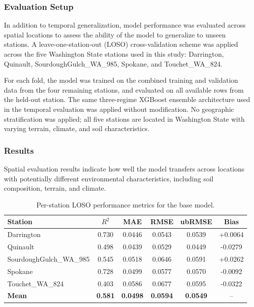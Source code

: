 \subsubsection*{Evaluation Setup}
In addition to temporal generalization, model performance was evaluated across spatial locations
to assess the ability of the model to generalize to unseen stations. A leave-one-station-out
(LOSO) cross-validation scheme was applied across the five Washington State stations used in
this study: Darrington, Quinault, SourdoughGulch\_WA\_985, Spokane, and Touchet\_WA\_824.

For each fold, the model was trained on the combined training and validation data from the
four remaining stations, and evaluated on all available rows from the held-out station. The
same three-regime XGBoost ensemble architecture used in the temporal evaluation was applied
without modification. No geographic stratification was applied; all five stations are located
in Washington State with varying terrain, climate, and soil characteristics.

\subsubsection*{Results}
Spatial evaluation results indicate how well the model transfers across locations with
potentially different environmental characteristics, including soil composition, terrain,
and climate.

\begin{table}[H]
\centering
\begin{tabular}{lccccc}
\toprule
\textbf{Station} & \textbf{$R^2$} & \textbf{MAE} & \textbf{RMSE} & \textbf{ubRMSE} & \textbf{Bias} \\
\midrule
Darrington              & 0.730 & 0.0446 & 0.0543 & 0.0539 & +0.0064 \\
Quinault                & 0.498 & 0.0439 & 0.0529 & 0.0449 & -0.0279 \\
SourdoughGulch\_WA\_985 & 0.545 & 0.0518 & 0.0646 & 0.0591 & +0.0262 \\
Spokane                 & 0.728 & 0.0499 & 0.0577 & 0.0570 & -0.0092 \\
Touchet\_WA\_824        & 0.403 & 0.0586 & 0.0677 & 0.0595 & -0.0322 \\
\midrule
\textbf{Mean}           & \textbf{0.581} & \textbf{0.0498} & \textbf{0.0594} & \textbf{0.0549} & -- \\
\bottomrule
\end{tabular}
\caption{Per-station LOSO performance metrics for the base model.}
\end{table}

